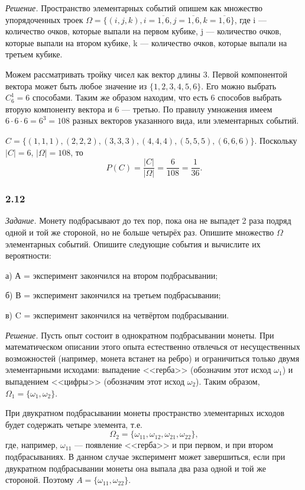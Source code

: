 \documentclass{book}
\begin{document}
\textit{Решение.} Пространство элементарных событий опишем как множество упорядоченных троек $\Omega=\{\left(i, j, k\right), i=\overline{1, 6}, j=\overline{1, 6}, k=\overline{1, 6}\}$, где i --- количество очков, которые выпали на первом кубике, j --- количество очков, которые выпали на втором кубике, k --- количество очков, которые выпали на третьем кубике.

Можем рассматривать тройку чисел как вектор длины 3. Первой компонентой вектора может быть любое значение из $\{1, 2, 3, 4, 5, 6\}$. Его можно выбрать $C_6^1=6$ способами. Таким же образом находим, что есть 6 способов выбрать вторую компоненту вектора и 6 --- третью. По правилу умножения имеем $6\cdot 6\cdot 6=6^3=108$ разных векторов указанного вида, или элементарных событий.

$C=\{(1, 1, 1), (2, 2, 2), (3, 3, 3), (4, 4, 4), (5, 5, 5), (6, 6, 6)\}$. Поскольку $|C|=6$, $|\Omega|=108$, то $$P(C)=\frac{|C|}{|\Omega|}=\frac{6}{108}=\frac{1}{36}.$$

\subsubsection*{2.12}

\textit{Задание.} Монету подбрасывают до тех пор, пока она не выпадет 2 раза подряд одной и той же стороной, но не больше четырёх раз. Опишите множество $\Omega$ элементарных событий. Опишите следующие события и вычислите их вероятности:

а) А = { эксперимент закончился на втором подбрасывании};

б) В = { эксперимент закончился на третьем подбрасывании};

в) C = { эксперимент закончился на четвёртом подбрасывании}.

\textit{Решение.}  Пусть опыт состоит в однократном подбрасывании монеты. При математическом описании этого опыта естественно отвлечься от несущественных возможностей (например, монета встанет на ребро) и ограничиться только двумя элементарными исходами: выпадение <<герба>> (обозначим этот исход $\omega_1$) и выпадением <<цифры>> (обозначим этот исход $\omega_2$). Таким образом, $\Omega_1=\{\omega_1, \omega_2\}$.

При двукратном подбрасывании монеты пространство элементарных исходов будет содержать четыре элемента, т.е. $$\Omega_2=\{\omega_{11}, \omega_{12}, \omega_{21}, \omega_{22}\},$$ где, например, $\omega_{11}$ --- появление <<герба>> и при первом, и при втором подбрасываниях. В данном случае эксперимент может завершиться, если при двукратном подбрасывании монеты она выпала два раза одной и той же стороной. Поэтому $A=\{\omega_{11}, \omega_{22}\}$.
\end{document}
